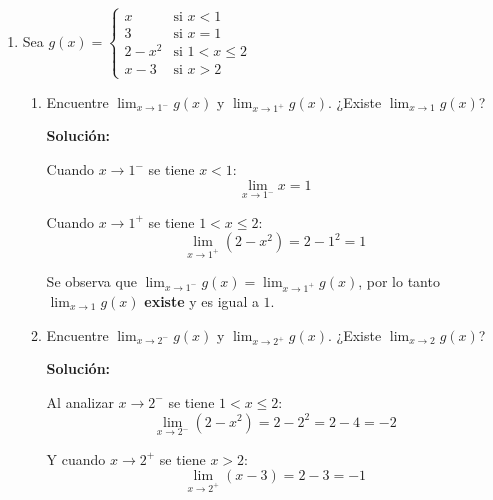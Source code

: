 \documentclass[12pt]{article}
\newcommand{\solucion}{%
    \vspace{0.8em}%
    \textbf{Solución:}%
}
\begin{document}
\begin{enumerate}[label=\alph*)]
\begin{enumerate}[label=\roman*.]
\begin{figure}[H]
                \caption{Gráfica de $f(x)$ mostrando la discontinuidad en $x=1$}
            \end{figure}
    \end{enumerate}

    \newpage
    \item Sea $g(x) = \begin{cases} x & \text{si } x < 1 \\ 3 & \text{si } x = 1 \\ 2 - x^2 & \text{si } 1 < x \leq 2 \\ x - 3 & \text{si } x > 2 \end{cases}$

    \begin{enumerate}[label=\roman*.]
        \item Encuentre $\lim_{x \to 1^-} g(x)$ y $\lim_{x \to 1^+} g(x)$. ¿Existe $\lim_{x \to 1} g(x)$?

        \solucion

        Cuando $x \to 1^-$ se tiene $x < 1$:
        \[
            \lim_{x\to1^-} x = 1
        \]

        Cuando $x \to 1^+$ se tiene $1 < x \leq 2$:
        \[
            \lim_{x\to1^+}(2-x^2) = 2-1^2 = 1
        \]

        Se observa que $\displaystyle\lim_{x\to1^-}g(x) = \lim_{x\to1^+}g(x)$, por lo tanto $\displaystyle\lim_{x\to1}g(x)$ \textbf{existe} y es igual a $1$.

        \item Encuentre $\lim_{x \to 2^-} g(x)$ y $\lim_{x \to 2^+} g(x)$. ¿Existe $\lim_{x \to 2} g(x)$?

        \solucion

        Al analizar $x \to 2^-$ se tiene $1 < x \leq 2$:
        \[
            \lim_{x\to2^-}(2-x^2) = 2-2^2 = 2-4 = -2
        \]

        Y cuando $x \to 2^+$ se tiene $x > 2$:
        \[
            \lim_{x\to2^+}(x-3) = 2-3 = -1
        \]


\end{enumerate}
\end{enumerate}
\end{document}
